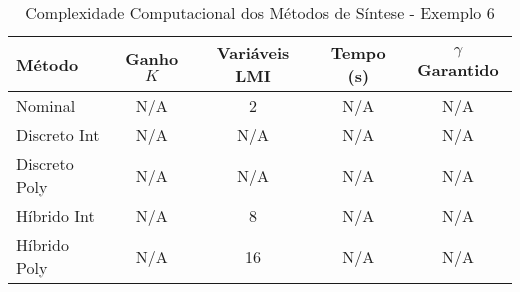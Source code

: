 \begin{table}[htbp]
\centering
\caption{Complexidade Computacional dos Métodos de Síntese - Exemplo 6}
\label{tab:complexidade_ex6}
\begin{tabular}{lcccc}
\hline
Método & Ganho $K$ & Variáveis LMI & Tempo (s) & $\gamma$ Garantido \\
\hline
Nominal & N/A & 2 & N/A & N/A \\
Discreto Int & N/A & N/A & N/A & N/A \\
Discreto Poly & N/A & N/A & N/A & N/A \\
Híbrido Int & N/A & 8 & N/A & N/A \\
Híbrido Poly & N/A & 16 & N/A & N/A \\
\hline
\end{tabular}
\end{table}

